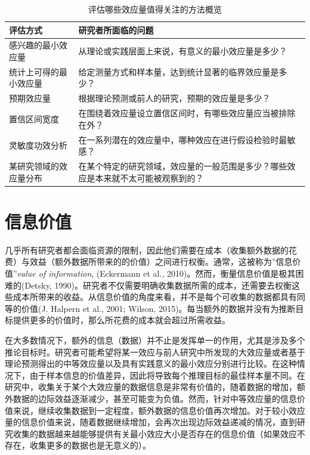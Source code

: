 \documentclass[
  letterpaper,
  DIV=11,
  numbers=noendperiod]{scrreprt}
\begin{document}
\hypertarget{tbl-table-effect-eval}{}
\begin{table}
\caption{\label{tbl-table-effect-eval}评估哪些效应量值得关注的方法概览 }\tabularnewline

\centering
\begin{tabular}{>{\raggedright\arraybackslash}p{5cm}|>{\raggedright\arraybackslash}p{10cm}}
\hline
评估方式 & 研究者所面临的问题\\
\hline
感兴趣的最小效应量 & 从理论或实践层面上来说，有意义的最小效应量是多少？\\
\hline
统计上可得的最小效应量 & 给定测量方式和样本量，达到统计显著的临界效应量是多少？\\
\hline
预期效应量 & 根据理论预测或前人的研究，预期的效应量是多少？\\
\hline
置信区间宽度 & 在围绕着效应量设立置信区间时，有哪些效应量应当被排除在外？\\
\hline
灵敏度功效分析 & 在一系列潜在的效应量中，哪种效应在进行假设检验时最敏感？\\
\hline
某研究领域的效应量分布 & 在某个特定的研究领域，效应量的一般范围是多少？哪些效应是本来就不太可能被观察到的？\\
\hline
\end{tabular}
\end{table}

\hypertarget{ux4fe1ux606fux4ef7ux503c}{%
\section{信息价值}\label{ux4fe1ux606fux4ef7ux503c}}

几乎所有研究者都会面临资源的限制，因此他们需要在成本（收集额外数据的花费）与效益（额外数据所带来的的价值）之间进行权衡。通常，这被称为''信息价值''\emph{value
of information}, (Eckermann et al.,
2010)。然而，衡量信息价值是极其困难的(Detsky,
1990)。研究者不仅需要明确收集数据所需的成本，还需要去权衡这些成本所带来的收益。从信息价值的角度来看，并不是每个可收集的数据都具有同等的价值(J.
Halpern et al., 2001; Wilson,
2015)。每当额外的数据并没有为推断目标提供更多的价值时，那么所花费的成本就会超过所需收益。

在大多数情况下，额外的信息（数据）并不止是发挥单一的作用，尤其是涉及多个推论目标时。研究者可能希望将某一效应与前人研究中所发现的大效应量或者基于理论预测得出的中等效应量以及具有实践意义的最小效应分别进行比较。在这种情况下，由于样本信息的价值差异，因此将导致每个推理目标的最佳样本量不同。在研究中，收集关于某个大效应量的数据信息是非常有价值的，随着数据的增加，额外数据的边际效益逐渐减少，甚至可能变为负值。然而，针对中等效应量的信息价值来说，继续收集数据到一定程度，额外数据的信息价值再次增加。对于较小效应量的信息价值来说，随着数据继续增加，会再次出现边际效益递减的情况，直到研究收集的数据越来越能够提供有关最小效应大小是否存在的信息价值（如果效应不存在，收集更多的数据也是无意义的）。
\end{document}
